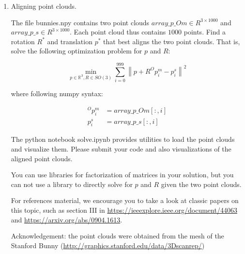 \documentclass[12pt]{article}
\begin{document}
\begin{enumerate}
\item Aligning point clouds. 

The file bunnies.npy contains two point clouds $array\_p\_Om \in R^{3 \times 1000}$ and $array\_p\_s \in R^{3 \times 1000}$. Each point cloud thus contains $1000$ points. Find a rotation $R^*$ and translation $p^*$ that best aligns the two point clouds. That is, solve the following optimization problem for $p$ and $R$:

\begin{equation}
\min_{p \in \mathbb{R}^{3}, R \in SO(3)} \sum_{i=0}^{999} \left\| p + R ^Op^m_i - p^s_i \right\|^{2}
\end{equation}

where following numpy syntax:

\begin{align*}
    ^Op^m_i & = array\_p\_Om[:, i] \\
    p^s_i & = array\_p\_s[:, i]
\end{align*}

The python notebook solve.ipynb provides utilities to load the point clouds and visualize them. Please submit your code and also visualizations of the aligned point clouds.

You can use libraries for factorization of matrices in your solution, but you can not use a library to directly solve for $p$ and $R$ given the two point clouds.

For references material, we encourage you to take a look at classic papers on this topic, such as section III in \url{https://ieeexplore.ieee.org/document/44063} and \url{https://arxiv.org/abs/0904.1613}.

Acknowledgement: the point clouds were obtained from the mesh of the Stanford Bunny (\url{http://graphics.stanford.edu/data/3Dscanrep/})

\end{enumerate}
\end{document}
